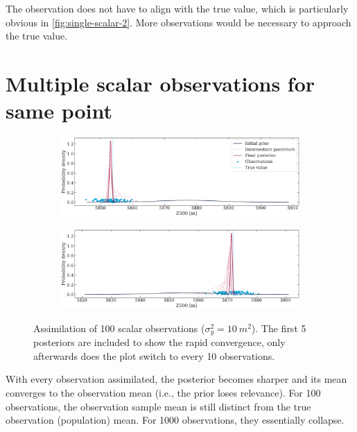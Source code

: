 \documentclass[parskip=half,DIV=16]{scrartcl}
\begin{document}
 The observation does not have to align with the true value, which is particularly obvious in \cref{fig:single-scalar-2}. More observations would be necessary to approach the true value.




\section{Multiple scalar observations for same point}

\begin{figure}[H]
   \centering

   \begin{subfigure}[c]{\textwidth}
      \includegraphics[width=\textwidth]{figures/multiple_point1_var10.pdf}
   \end{subfigure}
   
   \bigskip
   
   \begin{subfigure}[c]{\textwidth}
      \includegraphics[width=\textwidth]{figures/multiple_point2_var10.pdf}
   \end{subfigure}
   
   \caption{Assimilation of 100 scalar observations ($\sigma_y^2 = \qty{10}{m^2}$). The first 5 posteriors are included to show the rapid convergence, only afterwards does the plot switch to every 10 observations.}
\end{figure}

With every observation assimilated, the posterior becomes sharper and its mean converges to the observation mean (i.e., the prior loses relevance). For 100 observations, the observation sample mean is still distinct from the true observation (population) mean. For 1000 observations, they essentially collapse.
\end{document}
